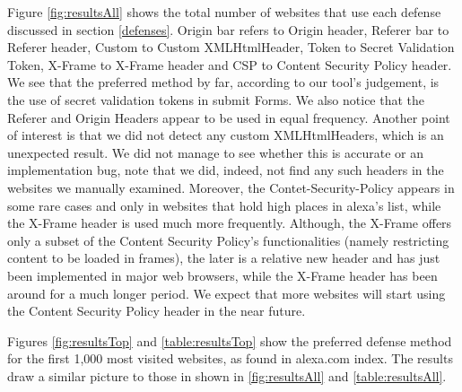 Figure \ref{fig:resultsAll} shows the total number of websites that use each defense discussed in section \ref{defenses}. 
Origin bar refers to Origin header, Referer bar to Referer header, Custom to Custom XMLHtmlHeader, Token to Secret Validation
Token, X-Frame to X-Frame header and CSP to Content Security Policy header.  
We see that the preferred method by far, according to our tool's judgement, is the use of secret validation tokens in submit Forms.  
We also notice that the Referer and Origin Headers appear to be used in equal frequency.  Another point of interest is that we did not detect any 
custom XMLHtmlHeaders, which is an unexpected result.  We did not manage to see whether this is accurate or an implementation bug, note
that we did, indeed, not find any such headers in the websites we manually examined.  Moreover, the Contet-Security-Policy appears in some
rare cases and only in websites that hold high places in alexa's list, while the X-Frame header is used much more frequently.  Although,
the X-Frame offers only a subset of the Content Security Policy's functionalities (namely restricting content to be loaded in frames), the
later is a relative new header and has just been implemented in major web browsers, while the X-Frame header has been around for a much
longer period.  We expect that more websites will start using the Content Security Policy header in the near future.

Figures \ref{fig:resultsTop} and \ref{table:resultsTop} show the preferred defense method for the first 1,000 most visited websites, as found in
alexa.com index.  The results draw a similar picture to those in shown in \ref{fig:resultsAll} and \ref{table:resultsAll}. 

